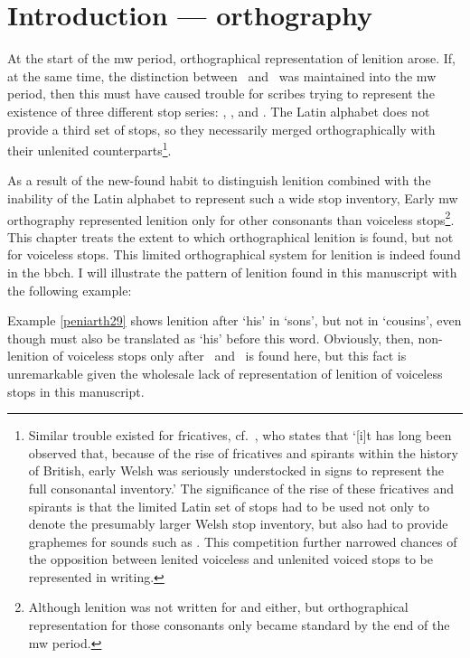\chapter{Introduction --- orthography}
\label{cha:intr-orth}

 At  the start of the \gls{mw} period, orthographical representation of lenition arose. If, at the same time, the distinction between \lT\ and \xD\ was maintained into the \gls{mw} period, then this must have caused trouble for scribes trying to represent the existence of three different stop series: \xT, \lT, and \xD. The Latin alphabet does not provide a third set of stops, so they necessarily merged orthographically with their unlenited counterparts\footnote{Similar trouble existed for fricatives, cf.\ \textcite[28]{russell_rowynniauc_2003}, who states that `[i]t has long been observed that, because of the rise of fricatives and spirants within the history of British, early Welsh was seriously understocked in signs to represent the full consonantal inventory.' The significance of the rise of these fricatives and spirants is that the limited Latin set of stops had to be used not only to denote the presumably larger Welsh stop inventory, but also had to provide graphemes for sounds such as \lT. This competition further narrowed chances of the opposition between lenited voiceless and unlenited voiced stops to be represented in writing.}. 

As a result of the new-found habit to distinguish lenition combined with the inability of the Latin alphabet to represent such a wide stop inventory, Early \gls{mw} orthography represented lenition only for other consonants than voiceless stops\footnote{Although lenition was not written for  and  either, but orthographical representation for those consonants only became standard by the end of the \gls{mw} period.}. This chapter treats the extent to which orthographical lenition is found, but not for voiceless stops. This limited orthographical system for lenition is indeed found in the \gls{bbch}. I will illustrate the pattern of lenition found in this manuscript with the following example: 


Example \ref{peniarth29} shows lenition after  `his' in  `sons', but not in  `cousins', even though  must also be translated as `his' before this word. Obviously, then, non-lenition of voiceless stops only after \ei\ and \oes\ is found here, but this fact is unremarkable given the wholesale lack of representation of lenition of voiceless stops in this manuscript. 

